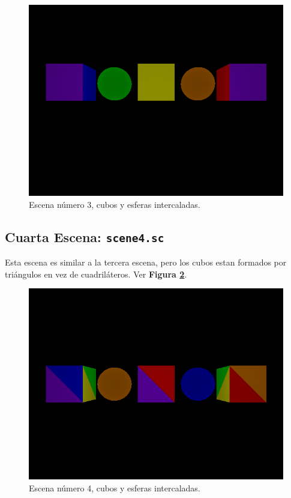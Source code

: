 \documentclass[a4paper,10pt]{article}
\begin{document}
\begin{figure}[h]
 \centering
 \includegraphics[width=320pt,keepaspectratio=true]{../scene3.png}
 \caption{Escena n\'umero 3, cubos y esferas intercaladas.}
 \label{fig:3}
\end{figure}

\subsection{Cuarta Escena: \texttt{scene4.sc}}
Esta escena es similar a la tercera escena, pero los cubos estan formados por tri\'angulos en vez de cuadril\'ateros.  Ver \textbf{Figura \ref{fig:4}}.

\begin{figure}[h]
 \centering
 \includegraphics[width=320pt,keepaspectratio=true]{../scene4.png}
 \caption{Escena n\'umero 4, cubos y esferas intercaladas.}
 \label{fig:4}
\end{figure}
\end{document}
